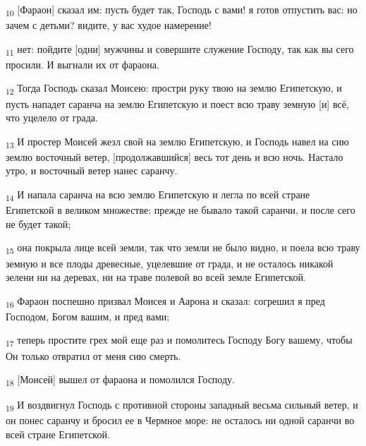 \begin{tcolorbox}
\textsubscript{10} [Фараон] сказал им: пусть будет так, Господь с вами! я готов отпустить вас: но зачем с детьми? видите, у вас худое намерение!
\end{tcolorbox}
\begin{tcolorbox}
\textsubscript{11} нет: пойдите [одни] мужчины и совершите служение Господу, так как вы сего просили. И выгнали их от фараона.
\end{tcolorbox}
\begin{tcolorbox}
\textsubscript{12} Тогда Господь сказал Моисею: простри руку твою на землю Египетскую, и пусть нападет саранча на землю Египетскую и поест всю траву земную [и] всё, что уцелело от града.
\end{tcolorbox}
\begin{tcolorbox}
\textsubscript{13} И простер Моисей жезл свой на землю Египетскую, и Господь навел на сию землю восточный ветер, [продолжавшийся] весь тот день и всю ночь. Настало утро, и восточный ветер нанес саранчу.
\end{tcolorbox}
\begin{tcolorbox}
\textsubscript{14} И напала саранча на всю землю Египетскую и легла по всей стране Египетской в великом множестве: прежде не бывало такой саранчи, и после сего не будет такой;
\end{tcolorbox}
\begin{tcolorbox}
\textsubscript{15} она покрыла лице всей земли, так что земли не было видно, и поела всю траву земную и все плоды древесные, уцелевшие от града, и не осталось никакой зелени ни на деревах, ни на траве полевой во всей земле Египетской.
\end{tcolorbox}
\begin{tcolorbox}
\textsubscript{16} Фараон поспешно призвал Моисея и Аарона и сказал: согрешил я пред Господом, Богом вашим, и пред вами;
\end{tcolorbox}
\begin{tcolorbox}
\textsubscript{17} теперь простите грех мой еще раз и помолитесь Господу Богу вашему, чтобы Он только отвратил от меня сию смерть.
\end{tcolorbox}
\begin{tcolorbox}
\textsubscript{18} [Моисей] вышел от фараона и помолился Господу.
\end{tcolorbox}
\begin{tcolorbox}
\textsubscript{19} И воздвигнул Господь с противной стороны западный весьма сильный ветер, и он понес саранчу и бросил ее в Чермное море: не осталось ни одной саранчи во всей стране Египетской.
\end{tcolorbox}
